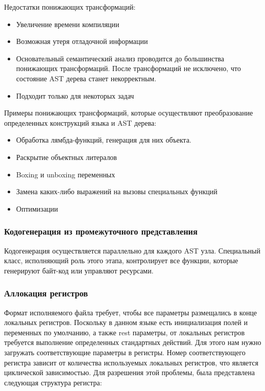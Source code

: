 Недостатки понижающих трансформаций:

\begin{itemize}[left=2em]
    \item Увеличение времени компиляции
    \item Возможная утеря отладочной информации
    \item Основательный семантический анализ проводится до большинства понижающих трансформаций.
    После трансформаций не исключено, что состояние AST дерева станет некорректным.
    \item Подходит только для некоторых задач
\end{itemize}

Примеры понижающих трансформаций, которые осуществляют преобразование определенных конструкций языка и AST дерева:

\begin{itemize}[left=2em]
    \item Обработка лямбда-функций, генерация для них объекта.
    \item Раскрытие объектных литералов
    \item Boxing и unboxing переменных
    \item Замена каких-либо выражений на вызовы специальных функций
    \item Оптимизации
\end{itemize}

\subsubsection{Кодогенерация из промежуточного представления}

Кодогенерация осуществляется параллельно для каждого AST узла.
Специальный класс, исполняющий роль этого этапа, контролирует все функции, которые генерируют байт-код или
управляют ресурсами.

\subsubsection{Аллокация регистров}

Формат исполняемого файла требует, чтобы все параметры размещались в конце локальных регистров.
Поскольку в данном языке есть инициализация полей и переменных по умолчанию, а также rest параметры, от локальных
регистров требуется выполнение определенных стандартных действий.
Для этого нам нужно загружать соответствующие параметры в регистры.
Номер соответствующего регистра зависит от количества используемых локальных регистров, что является циклической
зависимостью.
Для разрешения этой проблемы, была представлена следующая структура регистра:

